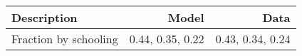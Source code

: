 \begin{tabular}{lrr}
\hline
Description & Model  & Data  \\
\hline
Fraction by schooling & 0.44, 0.35, 0.22  & 0.43, 0.34, 0.24  \\
\hline
\end{tabular}%
